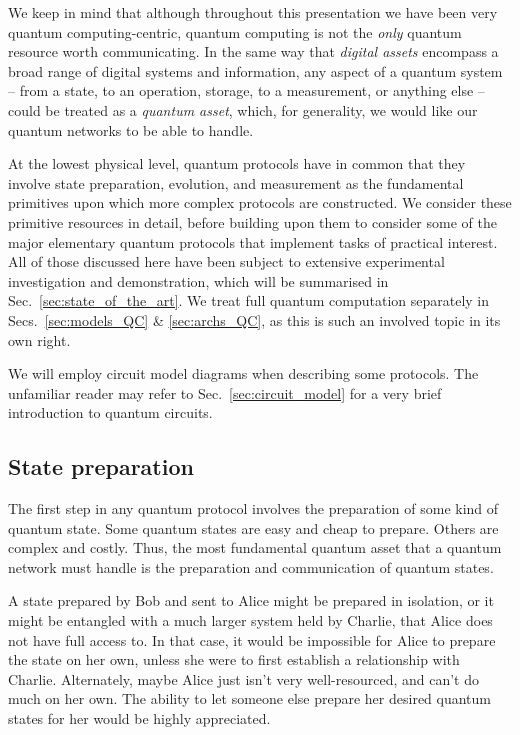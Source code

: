 \documentclass[aps, rmp, twocolumn, amsmath, amssymb, nofootinbib, superscriptaddress, longbibliography, floatfix, table-of-contents, eqsecnum]{revtex4-1}
\begin{document}
We keep in mind that although throughout this presentation we have been very quantum computing-centric, quantum computing is not the \textit{only} quantum resource worth communicating. In the same way that \textit{digital assets} encompass a broad range of digital systems and information, any aspect of a quantum system -- from a state, to an operation, storage, to a measurement, or anything else -- could be treated as a \textit{quantum asset}, which, for generality, we would like our quantum networks to be able to handle.

At the lowest physical level, quantum protocols have in common that they involve state preparation, evolution, and measurement as the fundamental primitives upon which more complex protocols are constructed. We consider these primitive resources in detail, before building upon them to consider some of the major elementary quantum protocols that implement tasks of practical interest. All of those discussed here have been subject to extensive experimental investigation and demonstration, which will be summarised in Sec.~\ref{sec:state_of_the_art}. We treat full quantum computation separately in Secs.~\ref{sec:models_QC} \& \ref{sec:archs_QC}, as this is such an involved topic in its own right.

We will employ circuit model diagrams when describing some protocols. The unfamiliar reader may refer to Sec.~\ref{sec:circuit_model} for a very brief introduction to quantum circuits.

%
%

\subsection{State preparation} 

The first step in any quantum protocol involves the preparation of some kind of quantum state. Some quantum states are easy and cheap to prepare. Others are complex and costly. Thus, the most fundamental quantum asset that a quantum network must handle is the preparation and communication of quantum states.

A state prepared by Bob and sent to Alice might be prepared in isolation, or it might be entangled with a much larger system held by Charlie, that Alice does not have full access to. In that case, it would be impossible for Alice to prepare the state on her own, unless she were to first establish a relationship with Charlie. Alternately, maybe Alice just isn't very well-resourced, and can't do much on her own. The ability to let someone else prepare her desired quantum states for her would be highly appreciated.
\end{document}
